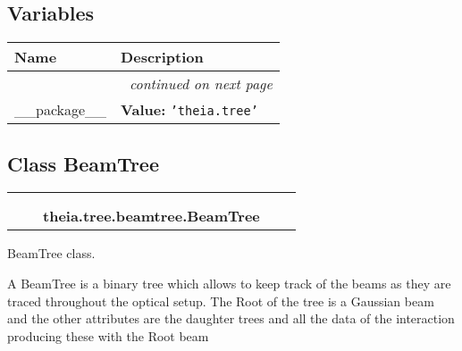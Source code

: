 
  \subsection{Variables}

    \vspace{-1cm}
\hspace{\varindent}\begin{longtable}{|p{\varnamewidth}|p{\vardescrwidth}|l}
\cline{1-2}
\cline{1-2} \centering \textbf{Name} & \centering \textbf{Description}& \\
\cline{1-2}
\endhead\cline{1-2}\multicolumn{3}{r}{\small\textit{continued on next page}}\\\endfoot\cline{1-2}
\endlastfoot\raggedright \_\-\_\-p\-a\-c\-k\-a\-g\-e\-\_\-\_\- & \raggedright \textbf{Value:} 
{\tt \texttt{'}\texttt{theia.tree}\texttt{'}}&\\
\cline{1-2}
\end{longtable}



\subsection{Class BeamTree}

    \label{theia:tree:beamtree:BeamTree}
\begin{tabular}{cccccc}
\multicolumn{2}{r}{\settowidth{\BCL}{object}\multirow{2}{\BCL}{object}}
&&
  \\\cline{3-3}
  &&\multicolumn{1}{c|}{}
&&
  \\
&&\multicolumn{2}{l}{\textbf{theia.tree.beamtree.BeamTree}}
\end{tabular}

BeamTree class.

A BeamTree is a binary tree which allows to keep track of the beams as they
are traced throughout the optical setup. The Root of the tree is a Gaussian
beam and the other attributes are the daughter trees and all the data of 
the interaction producing these with the Root beam

